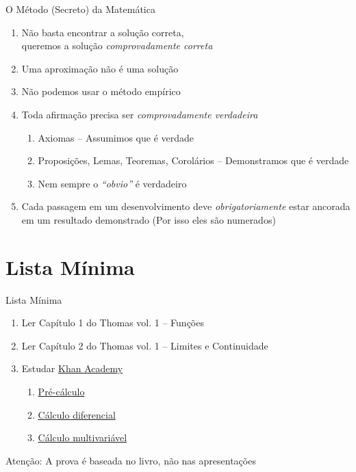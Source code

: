 \begin{frame}{O Método (Secreto) da Matemática}
  \begin{enumerate}[<+->]
    \item Não basta encontrar a solução correta, \\
          queremos a solução \emph{comprovadamente correta}
    \item Uma aproximação não é uma solução
    \item Não podemos usar o método empírico
    \item Toda afirmação precisa ser \emph{comprovadamente verdadeira}
    \begin{enumerate}
      \item Axiomas -- Assumimos que é verdade
      \item Proposições, Lemas, Teoremas, Corolários -- Demonstramos que é verdade
      \item Nem sempre o \textit{``obvio''} é verdadeiro
    \end{enumerate}
    \item Cada passagem em um desenvolvimento deve \emph{obrigatoriamente}
    estar ancorada em um resultado demonstrado (Por isso eles são numerados)
  \end{enumerate}
\end{frame}

\section{Lista Mínima}

\begin{frame}{Lista Mínima}
  \begin{enumerate}
    \item Ler Capítulo 1 do Thomas vol. 1 -- Funções
    \item Ler Capítulo 2 do Thomas vol. 1 -- Limites e Continuidade
    \item Estudar \href{https://pt.khanacademy.org}{Khan Academy}
    \begin{enumerate}
      \item \href{https://pt.khanacademy.org/math/precalculus}{Pré-cálculo}
      \item \href{https://pt.khanacademy.org/math/differential-calculus}{Cálculo diferencial}
      \item \href{https://pt.khanacademy.org/math/multivariable-calculus}{Cálculo multivariável}
    \end{enumerate}
  \end{enumerate}

  \vfill
  Atenção: A prova é baseada no livro, não nas apresentações
\end{frame}


